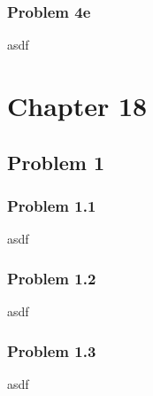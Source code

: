 \documentclass{article}
\begin{document}
\subsubsection{Problem 4e}
asdf


\newpage
\section{\textbf{Chapter 18}}
\subsection{Problem 1}
\subsubsection{Problem 1.1}
asdf


\subsubsection{Problem 1.2}
asdf


\subsubsection{Problem 1.3}
asdf
\end{document}
